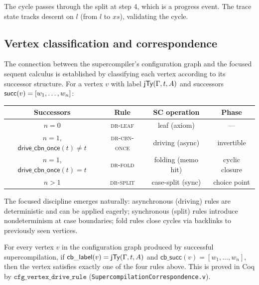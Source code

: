 \noindent The cycle passes through the split at step 4, which is a progress event. The trace state tracks descent on $l$ (from $l$ to $xs$), validating the cycle.

\subsection{Vertex classification and correspondence}
\label{sec:vertex-classification}

The connection between the supercompiler's configuration graph and the focused sequent calculus is established by classifying each vertex according to its successor structure. For a vertex $v$ with label $\mathsf{jTy}(\Gamma, t, A)$ and successors $\mathsf{succ}(v) = [w_1, \ldots, w_n]$:

\begin{center}
\small
\begin{tabular}{c|c|c|c}
\textbf{Successors} & \textbf{Rule} & \textbf{SC operation} & \textbf{Phase} \\
\hline
$n = 0$ & \textsc{dr-leaf} & leaf (axiom) & — \\
$n = 1$, $\mathsf{drive\_cbn\_once}(t) \neq t$ & \textsc{dr-cbn-once} & driving (async) & invertible \\
$n = 1$, $\mathsf{drive\_cbn\_once}(t) = t$ & \textsc{dr-fold} & folding (memo hit) & cyclic closure \\
$n > 1$ & \textsc{dr-split} & case-split (sync) & choice point \\
\end{tabular}
\end{center}

\noindent The focused discipline emerges naturally: asynchronous (driving) rules are deterministic and can be applied eagerly; synchronous (split) rules introduce nondeterminism at case boundaries; fold rules close cycles via backlinks to previously seen vertices.

\begin{proposition}
\label{prop:vertex-class}
For every vertex $v$ in the configuration graph produced by successful supercompilation, if $\mathsf{cb\_label}(v) = \mathsf{jTy}(\Gamma, t, A)$ and $\mathsf{cb\_succ}(v) = [w_1,\ldots,w_n]$, then the vertex satisfies exactly one of the four rules above. This is proved in Coq by $\texttt{cfg\_vertex\_drive\_rule}$ (\texttt{SupercompilationCorrespondence.v}).
\end{proposition}
